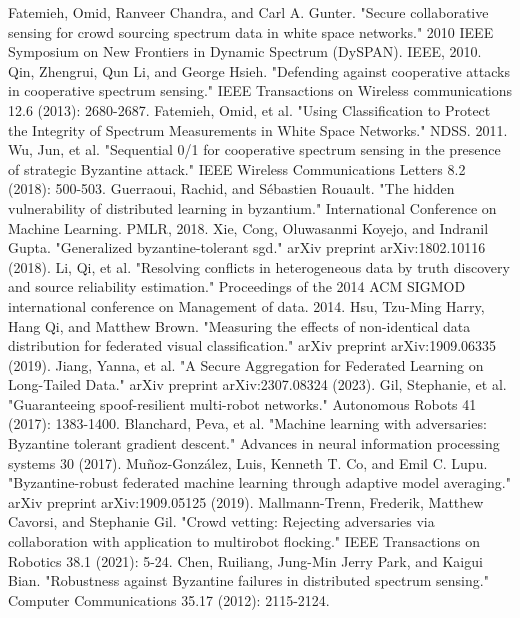 \documentclass[conference]{IEEEtran}
\begin{document}
\begin{thebibliography}{00}
     Fatemieh, Omid, Ranveer Chandra, and Carl A. Gunter. "Secure collaborative sensing for crowd sourcing spectrum data in white space networks." 2010 IEEE Symposium on New Frontiers in Dynamic Spectrum (DySPAN). IEEE, 2010.
     Qin, Zhengrui, Qun Li, and George Hsieh. "Defending against cooperative attacks in cooperative spectrum sensing." IEEE Transactions on Wireless communications 12.6 (2013): 2680-2687.
     Fatemieh, Omid, et al. "Using Classification to Protect the Integrity of Spectrum Measurements in White Space Networks." NDSS. 2011.
     Wu, Jun, et al. "Sequential 0/1 for cooperative spectrum sensing in the presence of strategic Byzantine attack." IEEE Wireless Communications Letters 8.2 (2018): 500-503.
     Guerraoui, Rachid, and Sébastien Rouault. "The hidden vulnerability of distributed learning in byzantium." International Conference on Machine Learning. PMLR, 2018.
     Xie, Cong, Oluwasanmi Koyejo, and Indranil Gupta. "Generalized byzantine-tolerant sgd." arXiv preprint arXiv:1802.10116 (2018).
     Li, Qi, et al. "Resolving conflicts in heterogeneous data by truth discovery and source reliability estimation." Proceedings of the 2014 ACM SIGMOD international conference on Management of data. 2014.
     Hsu, Tzu-Ming Harry, Hang Qi, and Matthew Brown. "Measuring the effects of non-identical data distribution for federated visual classification." arXiv preprint arXiv:1909.06335 (2019).
     Jiang, Yanna, et al. "A Secure Aggregation for Federated Learning on Long-Tailed Data." arXiv preprint arXiv:2307.08324 (2023).
     Gil, Stephanie, et al. "Guaranteeing spoof-resilient multi-robot networks." Autonomous Robots 41 (2017): 1383-1400.
     Blanchard, Peva, et al. "Machine learning with adversaries: Byzantine tolerant gradient descent." Advances in neural information processing systems 30 (2017).
     Muñoz-González, Luis, Kenneth T. Co, and Emil C. Lupu. "Byzantine-robust federated machine learning through adaptive model averaging." arXiv preprint arXiv:1909.05125 (2019).
     Mallmann-Trenn, Frederik, Matthew Cavorsi, and Stephanie Gil. "Crowd vetting: Rejecting adversaries via collaboration with application to multirobot flocking." IEEE Transactions on Robotics 38.1 (2021): 5-24.
     Chen, Ruiliang, Jung-Min Jerry Park, and Kaigui Bian. "Robustness against Byzantine failures in distributed spectrum sensing." Computer Communications 35.17 (2012): 2115-2124.

\end{thebibliography}
\end{document}
